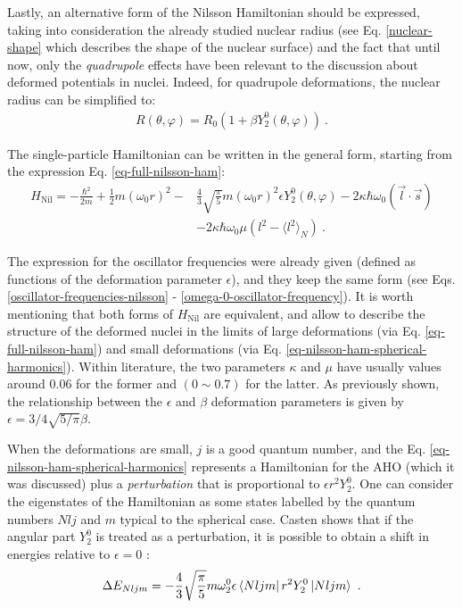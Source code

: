 Lastly, an alternative form of the Nilsson Hamiltonian should be expressed, taking into consideration the already studied nuclear radius (see Eq. \ref{nuclear-shape} which describes the shape of the nuclear surface) and the fact that until now, only the \emph{quadrupole} effects have been relevant to the discussion about deformed potentials in nuclei. Indeed, for quadrupole deformations, the nuclear radius can be simplified to:
\begin{align}
    R(\theta,\varphi)=R_0\left(1+\beta Y_2^0(\theta,\varphi)\right)\ .
    \label{simple-quadrupole-nuclear-surface}
\end{align}

The single-particle Hamiltonian can be written in the general form, starting from the expression Eq. \ref{eq-full-nilsson-ham}:
\begin{align}
    H_\text{Nil}=-\frac{\hbar^2}{2m}+\frac{1}{2}m(\omega_0r)^2-&\frac{4}{3}\sqrt{\frac{\pi}{5}}m(\omega_0r)^2\epsilon Y_2^0(\theta,\varphi)-2\kappa\hbar\omega_0(\vec{l}\cdot\vec{s})\nonumber\\
    &-2\kappa\hbar\omega_0\mu\left(l^2-\langle l^2\rangle_N\right)\ .
    \label{eq-nilsson-ham-spherical-harmonics}
\end{align}

The expression for the oscillator frequencies were already given (defined as functions of the deformation parameter $\epsilon$), and they keep the same form (see Eqs. \ref{oscillator-frequencies-nilsson} - \ref{omega-0-oscillator-frequency}). It is worth mentioning that both forms of $H_\text{Nil}$ are equivalent, and allow to describe the structure of the deformed nuclei in the limits of large deformations (via Eq. \ref{eq-full-nilsson-ham}) and small deformations (via Eq. \ref{eq-nilsson-ham-spherical-harmonics}). Within literature, the two parameters $\kappa$ and $\mu$ have usually values around $0.06$ for the former and $(0\sim 0.7)$ for the latter. As previously shown, the relationship between the $\epsilon$ and $\beta$ deformation parameters is given by $\epsilon=3/4\sqrt{5/\pi}\beta$.

When the deformations are small, $j$ is a good quantum number, and the Eq. \ref{eq-nilsson-ham-spherical-harmonics} represents a Hamiltonian for the AHO (which it was discussed) plus a \emph{perturbation} that is proportional to $\epsilon r^2Y_2^0$. One can consider the eigenstates of the Hamiltonian as some states labelled by the quantum numbers $Nlj$ and $m$ typical to the spherical case. Casten shows that if the angular part $Y_2^0$ is treated as a perturbation, it is possible to obtain a shift in energies relative to $\epsilon=0$ \cite{casten2000nuclear}:
\begin{align}
    \Delta E_{Nljm}=-\frac{4}{3}\sqrt{\frac{\pi}{5}}m\omega_2^0\epsilon\bra{Nljm}r^2Y_2^0\ket{Nljm}\ .
\end{align}

